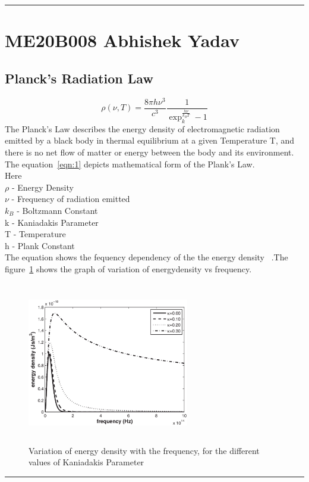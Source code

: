 
\hrule
\section{ME20B008 Abhishek Yadav}
\subsection{Planck's Radiation Law}
\begin{equation}
	\rho(\nu,T)={\frac{8 \pi h \nu^3}{c^3}}  {\frac{1}{\exp_k^{\frac{h \nu}{k_BT}} - 1}}
	\label{eqn:1}
\end{equation}
The Planck's Law describes the energy density of electromagnetic radiation emitted by a black body in thermal equilibrium at a given Temperature T, and there is no net flow of matter or energy between the body and its environment.
The equation~\ref{eqn:1} depicts mathematical form of the Plank's Law. \\
Here \\
$\rho$ - Energy Density \\
$\nu$  - Frequency of radiation emitted \\
$k_B$  -  Boltzmann Constant \\
k      -  Kaniadakis Parameter \\
T      - Temperature \\
h      - Plank Constant \\
The equation shows the fequency dependency of the the energy density ~\cite{meb008}.The figure~\ref{fig:me20b008} shows the graph of variation of energydensity vs frequency.
\begin{figure}[h]
        \begin{center}
		\includegraphics[width=200pt,height=200pt]{me20b008.eps}
		\end{center}
        \caption{Variation of energy density with the frequency, for the different values of Kaniadakis Parameter}
        \label{fig:me20b008}
\end{figure}
\hrule



